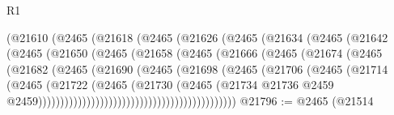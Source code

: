 \begin{lexlean}{R1}
\begin{coremodule}
                            (@21610
                              (@2465
                                (@21618
                                  (@2465
                                    (@21626
                                      (@2465
                                        (@21634
                                          (@2465
                                            (@21642
                                              (@2465
                                                (@21650
                                                  (@2465
                                                    (@21658
                                                      (@2465
                                                        (@21666
                                                          (@2465
                                                            (@21674
                                                              (@2465
                                                                (@21682
                                                                  (@2465
                                                                    (@21690
                                                                      (@2465
                                                                        (@21698
                                                                          (@2465
                                                                            (@21706
                                                                              (@2465
                                                                                (@21714
                                                                                  (@2465
                                                                                    (@21722
                                                                                      (@2465
                                                                                        (@21730
                                                                                          (@2465
                                                                                            (@21734
                                                                                              @21736
                                                                                              @2459
                                                                                              @2459)))))))))))))))))))))))))))))))))))))))))))))
@21796 := @2465
    (@21514

\end{coremodule}
\end{lexlean}
